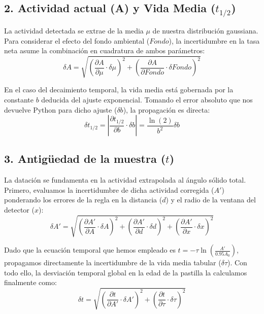 \documentclass[9pt,a4paper,twocolumn,twoside]{rho-class/rho}
\begin{document}
\subsection*{2. Actividad actual (A) y Vida Media ($t_{1/2}$)}
La actividad detectada se extrae de la media $\mu$ de nuestra distribución gaussiana. Para considerar el efecto del fondo ambiental ($Fondo$), la incertidumbre en la tasa neta asume la combinación en cuadratura de ambos parámetros:
\vspace{0.2cm}
\begin{equation*}
    \delta A = \sqrt{ \left( \frac{\partial A}{\partial \mu} \cdot \delta \mu \right)^2 + \left( \frac{\partial A}{\partial Fondo} \cdot \delta Fondo \right)^2 }
\end{equation*}
\vspace{0.2cm}

En el caso del decaimiento temporal, la vida media está gobernada por la constante $b$ deducida del ajuste exponencial. Tomando el error absoluto que nos devuelve Python para dicho ajuste ($\delta b$), la propagación es directa:
\vspace{0.2cm}
\begin{equation*}
    \delta t_{1/2} = \left| \frac{\partial t_{1/2}}{\partial b} \cdot \delta b \right| = \frac{\ln(2)}{b^2} \delta b
\end{equation*}
\vspace{0.2cm}

\subsection*{3. Antigüedad de la muestra ($t$)}
La datación se fundamenta en la actividad extrapolada al ángulo sólido total. Primero, evaluamos la incertidumbre de dicha actividad corregida ($A'$) ponderando los errores de la regla en la distancia ($d$) y el radio de la ventana del detector ($x$):
\vspace{0.2cm}
\begin{equation*}
    \delta A' = \sqrt{ \left( \frac{\partial A'}{\partial A} \cdot \delta A \right)^2 + \left( \frac{\partial A'}{\partial d} \cdot \delta d \right)^2 + \left( \frac{\partial A'}{\partial x} \cdot \delta x \right)^2 }
\end{equation*}
\vspace{0.2cm}

Dado que la ecuación temporal que hemos empleado es $t = -\tau \ln\left(\frac{A'}{0.95 A_0}\right)$, propagamos directamente la incertidumbre de la vida media tabular ($\delta \tau$). Con todo ello, la desviación temporal global en la edad de la pastilla la calculamos finalmente como:
\vspace{0.2cm}
\begin{equation*}
    \delta t = \sqrt{ \left( \frac{\partial t}{\partial A'} \cdot \delta A' \right)^2 + \left( \frac{\partial t}{\partial \tau} \cdot \delta \tau \right)^2 }
\end{equation*}
\vspace{0.2cm}
\end{document}

